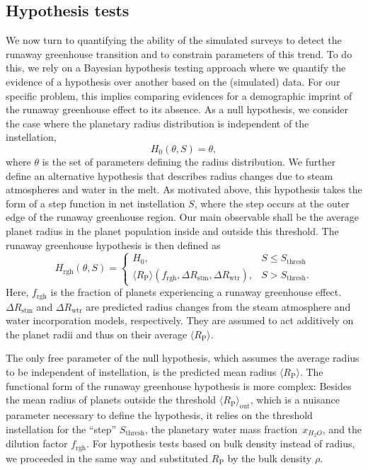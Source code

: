 \documentclass[twocolumn,twocolappendix]{aastex631}
\begin{document}
\subsection{Hypothesis tests}
We now turn to quantifying the ability of the simulated surveys to detect the runaway greenhouse transition and to constrain parameters of this trend.
To do this, we rely on a Bayesian hypothesis testing approach where we quantify the evidence of a hypothesis over another based on the (simulated) data.
For our specific problem, this implies comparing evidences for a demographic imprint of the runaway greenhouse effect to its absence.
    As a null hypothesis, we consider the case where the planetary radius distribution is independent of the instellation,
    \begin{equation}
        H_0(\theta, S) = \theta,
    \end{equation}
    where $\theta$ is the set of parameters defining the radius distribution.
    We further define an alternative hypothesis that describes radius changes due to steam atmospheres and water in the melt.
    As motivated above, this hypothesis takes the form of a step function in net instellation $S$, where the step occurs at the outer edge of the runaway greenhouse region.
    Our main observable shall be the average planet radius in the planet population inside and outside this threshold.
    The runaway greenhouse hypothesis is then defined as
\begin{equation}\label{eq:rgh_hypo}
    H_{\mathrm{rgh}}(\theta, S) =
        \begin{cases}
            H_0, &  S \leq S_\mathrm{thresh}\\
            \langle R_\mathrm{P}\rangle (f_\mathrm{rgh},\Delta R_\mathrm{stm}, \Delta R_\mathrm{wtr}), &  S > S_\mathrm{thresh}.
        \end{cases}
\end{equation}
    Here, $f_\mathrm{rgh}$ is the fraction of planets experiencing a runaway greenhouse effect.
    $\Delta R_\mathrm{stm}$ and $\Delta R_\mathrm{wtr}$ are predicted radius changes from the steam atmosphere and water incorporation models, respectively.
    They are assumed to act additively on the planet radii and thus on their average $\langle R_\mathrm{P}\rangle $.

The only free parameter of the null hypothesis, which assumes the average radius to be independent of instellation, is the predicted mean radius $\langle R_\mathrm{P}\rangle $.
The functional form of the runaway greenhouse hypothesis is more complex: Besides the mean radius of planets outside the threshold $\langle R_\mathrm{P}\rangle_\mathrm{out}$, which is a nuisance parameter necessary to define the hypothesis, it relies on the threshold instellation for the ``step'' $S_\mathrm{thresh}$, the planetary water mass fraction~$x_{H_2O}$, and the dilution factor $f_\mathrm{rgh}$.
For hypothesis tests based on bulk density instead of radius, we proceeded in the same way and substituted $R_\mathrm{P}$ by the bulk density $\rho$.
\end{document}
